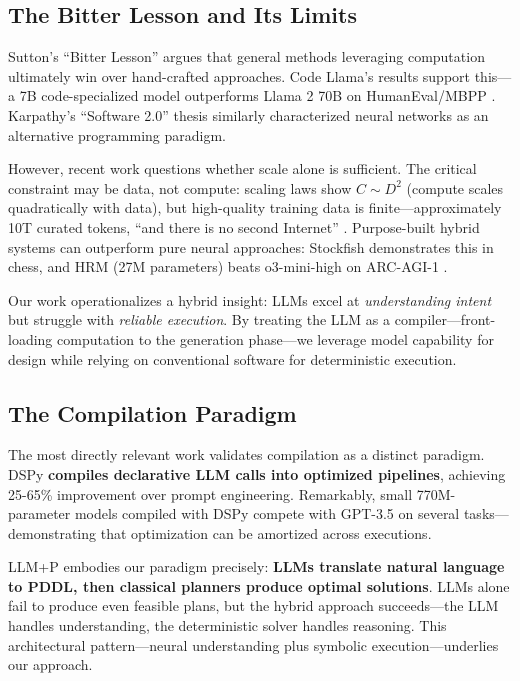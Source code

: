 \documentclass[11pt]{article}
\begin{document}
\subsection{The Bitter Lesson and Its Limits}

Sutton's ``Bitter Lesson'' \citep{sutton2019bitter} argues that general methods leveraging computation ultimately win over hand-crafted approaches. Code Llama's results support this—a 7B code-specialized model outperforms Llama 2 70B on HumanEval/MBPP \citep{roziere2023codellama}. Karpathy's ``Software 2.0'' thesis \citep{karpathy2017software2} similarly characterized neural networks as an alternative programming paradigm.

However, recent work questions whether scale alone is sufficient. The critical constraint may be data, not compute: scaling laws show $C \sim D^2$ (compute scales quadratically with data), but high-quality training data is finite—approximately 10T curated tokens, ``and there is no second Internet'' \citep{chakrabarti2025bitter}. Purpose-built hybrid systems can outperform pure neural approaches: Stockfish demonstrates this in chess, and HRM (27M parameters) beats o3-mini-high on ARC-AGI-1 \citep{breunig2025bitter}.

Our work operationalizes a hybrid insight: LLMs excel at \emph{understanding intent} but struggle with \emph{reliable execution}. By treating the LLM as a compiler—front-loading computation to the generation phase—we leverage model capability for design while relying on conventional software for deterministic execution.

\subsection{The Compilation Paradigm}

The most directly relevant work validates compilation as a distinct paradigm. DSPy \citep{khattab2023dspy} \textbf{compiles declarative LLM calls into optimized pipelines}, achieving 25-65\% improvement over prompt engineering. Remarkably, small 770M-parameter models compiled with DSPy compete with GPT-3.5 on several tasks—demonstrating that optimization can be amortized across executions.

LLM+P \citep{liu2023llmp} embodies our paradigm precisely: \textbf{LLMs translate natural language to PDDL, then classical planners produce optimal solutions}. LLMs alone fail to produce even feasible plans, but the hybrid approach succeeds—the LLM handles understanding, the deterministic solver handles reasoning. This architectural pattern—neural understanding plus symbolic execution—underlies our approach.
\end{document}
